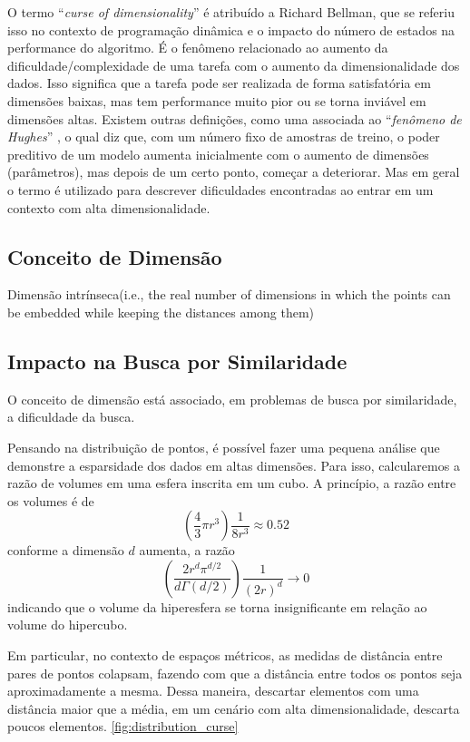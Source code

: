 O termo ``\textit{curse of dimensionality}'' é atribuído a Richard Bellman, que se referiu isso no contexto de programação dinâmica e o impacto do número de estados na performance do algoritmo. É o fenômeno relacionado ao aumento da dificuldade/complexidade de uma tarefa com o aumento da dimensionalidade dos dados. Isso significa que a tarefa pode ser realizada de forma satisfatória em dimensões baixas, mas tem performance muito pior ou se torna inviável em dimensões altas. Existem outras definições, como uma associada ao ``\textit{fenômeno de Hughes}'' \cite{meanacc:hughes1968}, o qual diz que, com um número fixo de amostras de treino, o poder preditivo de um modelo aumenta inicialmente com o aumento de dimensões (parâmetros), mas depois de um certo ponto, começar a deteriorar. Mas em geral o termo é utilizado para descrever dificuldades encontradas ao entrar em um contexto com alta dimensionalidade. 

\subsection{Conceito de Dimensão}

Dimensão intrínseca(i.e., the real number of dimensions
in which the points can be embedded
while keeping the distances among them)\cite{searching:chavez2001}

\subsection{Impacto na Busca por Similaridade}

O conceito de dimensão está associado, em problemas de busca por similaridade, a dificuldade da busca.

Pensando na distribuição de pontos, é possível fazer uma pequena análise que demonstre a esparsidade dos dados em altas dimensões. Para isso, calcularemos a razão de volumes em uma esfera inscrita em um cubo. A princípio, a razão entre os volumes é de
$$\left(\frac{4}{3} \pi r^3\right)\frac{1}{8r^3} \approx 0.52$$
conforme a dimensão $d$ aumenta, a razão 
$$\left(\frac{2r^d\pi^{d/2}}{d\Gamma(d/2)}\right)\frac{1}{(2r)^d} \to 0$$
indicando que o volume da hiperesfera se torna insignificante em relação ao volume do hipercubo. \cite{cursedim:wiki}

Em particular, no contexto de espaços métricos, as medidas de distância entre pares de pontos colapsam, fazendo com que a distância entre todos os pontos seja aproximadamente a mesma. Dessa maneira, descartar elementos com uma distância maior que a média, em um cenário com alta dimensionalidade, descarta poucos elementos. \cref{fig:distribution_curse}

